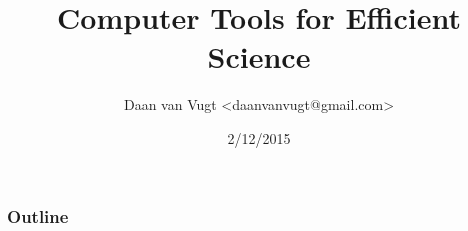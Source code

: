 \documentclass[aspectratio=169]{beamer}
\title{Computer Tools for Efficient Science}
\author{Daan van Vugt <daanvanvugt@gmail.com>}
\institute{TU/e}
\date{2/12/2015}
\begin{document}
\begin{frame}
\titlepage
\end{frame}

\begin{frame}
\frametitle{Outline}
\tableofcontents
\end{frame}


\end{document}
